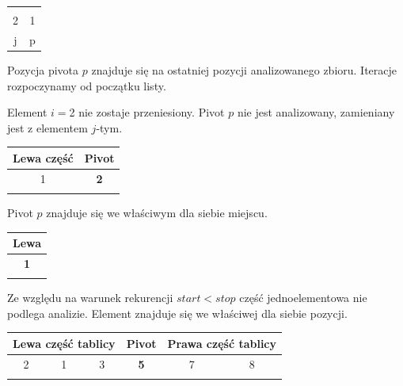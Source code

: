 \documentclass[a4paper,11pt]{report}
\begin{document}
\begin{table}[h!]
\Large
\centering
\begin{tabular}{|c|c|}
\hline
\cellcolor{black!25} &  \cellcolor{black!25}\\ 
\cellcolor{black!25}2 & \cellcolor{black!25}1 \\ \hdashline
j & p \\ \hline
\end{tabular}

\end{table}

Pozycja pivota $p$ znajduje się na ostatniej pozycji analizowanego zbioru. Iteracje rozpoczynamy od początku listy. 


Element $i=$2 nie zostaje przeniesiony. Pivot $p$ nie jest analizowany, zamieniany jest z elementem $j$-tym.

\begin{table}[h!]
\Large
\centering
\begin{tabular}{|c|c|}
\hline
 Lewa część & Pivot \\ \hline
1 &  \textbf{2}\\ \hdashline
 &  \\ \hline
\end{tabular}
\end{table}


Pivot $p$ znajduje się we właściwym dla siebie miejscu.

\begin{table}[h!]
\Large
\centering
\begin{tabular}{|c|}
\hline
Lewa \\ \hline
\textbf{1} \\ \hdashline
 \\ \hline
\end{tabular}

\end{table}

Ze względu na warunek rekurencji $start < stop$ część jednoelementowa nie podlega analizie. Element znajduje się we właściwej dla siebie pozycji.

\begin{table}[h!]
\Large
\centering
\begin{tabular}{|c|c|c|c|c|c|}
\hline
\multicolumn{3}{|c|}{Lewa część tablicy} & Pivot & \multicolumn{2}{c|}{Prawa część tablicy} \\ \hline
2 & 1 & 3 & \textbf{5} & 7 & 8 \\ \hdashline
 &  &  &  &  &  \\ \hline
\end{tabular}

\end{table}
\end{document}
